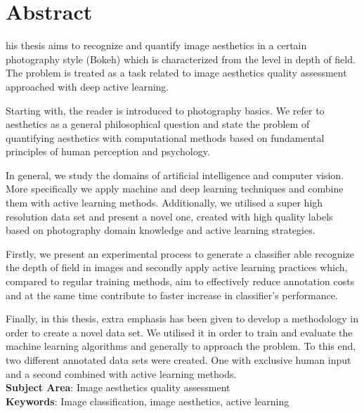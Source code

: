 \chapter*{Abstract}
his thesis aims to recognize and quantify image aesthetics in a certain photography style (Bokeh) which is characterized from the level in depth of field. The problem is treated as a task related to image aesthetics quality assessment approached with deep active learning.

Starting with, the reader is introduced to photography basics. We refer to aesthetics as a general philosophical question and state the problem of quantifying aesthetics with computational methods based on fundamental principles of human perception and psychology.

In general, we study the domains of artificial intelligence and computer vision. More specifically we apply machine and deep learning techniques and combine them with active learning methods. Additionally, we utilised a super high resolution data set and present a novel one, created with high quality labels based on photography domain knowledge and active learning strategies.

Firstly, we present an experimental process to generate a classifier able recognize the depth of field in images and secondly apply active learning practices which, compared to regular training methods, aim to effectively reduce annotation costs and at the same time contribute to faster increase in classifier's performance.

Finally, in this thesis, extra emphasis has been given to develop a methodology in order to create a novel data set. We utilised it in order to train and evaluate the machine learning algorithms and generally to approach the problem.
To this end, two different annotated data sets were created. One with exclusive human input and a second combined with active learning methods.\\
\textbf{Subject Area}: Image aesthetics quality assessment\\
\textbf{Keywords}: Image classification, image aesthetics, active learning
